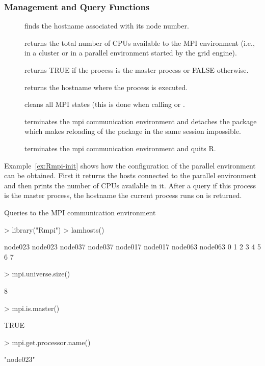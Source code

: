 \subsubsection{Management and Query Functions}

\begin{description}
\item[] finds the hostname associated with its node
  number.
\item[] returns the total number of CPUs
  available to the MPI environment (i.e., in a cluster or in a parallel
  environment started by the grid engine).
\item[] returns TRUE if the process is the
  master process or FALSE otherwise. 
\item[] returns the hostname where the
  process is executed.
\item[] cleans all MPI states (this is done when
  calling  or .
\item[] terminates the mpi communication
  environment and detaches the  package which makes reloading of
  the package  in the same session impossible.  
\item[] terminates the mpi communication
  environment and quits R.  
\end{description}

Example~\ref{ex:Rmpi-init} shows how the configuration of the
parallel environment can be obtained. First it returns the hosts
connected to the parallel environment and then prints the number of
CPUs available in it. After a query if this process is the master
process, the hostname the current process runs on is
returned. 

\begin{Example} Queries to the MPI communication environment
\label{ex:Rmpi-init}
\begin{Schunk}
\begin{Sinput}
> library("Rmpi")
> lamhosts()
\end{Sinput}
\begin{Soutput}
node023 node023 node037 node037 node017 node017 node063 node063 
      0       1       2       3       4       5       6       7 
\end{Soutput}
\begin{Sinput}
> mpi.universe.size()
\end{Sinput}
\begin{Soutput}
[1] 8
\end{Soutput}
\begin{Sinput}
> mpi.is.master()
\end{Sinput}
\begin{Soutput}
[1] TRUE
\end{Soutput}
\begin{Sinput}
> mpi.get.processor.name()
\end{Sinput}
\begin{Soutput}
[1] "node023"
\end{Soutput}
\end{Schunk}
\end{Example}

